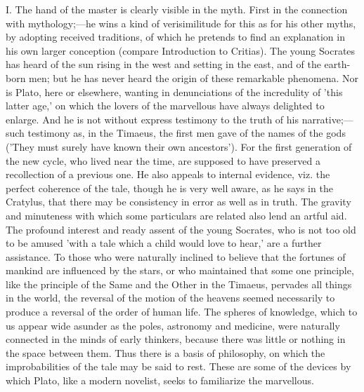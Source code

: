 \documentclass[11pt,letter]{article}
\begin{document}
\par  I. The hand of the master is clearly visible in the myth. First in the connection with mythology;—he wins a kind of verisimilitude for this as for his other myths, by adopting received traditions, of which he pretends to find an explanation in his own larger conception (compare Introduction to Critias). The young Socrates has heard of the sun rising in the west and setting in the east, and of the earth-born men; but he has never heard the origin of these remarkable phenomena. Nor is Plato, here or elsewhere, wanting in denunciations of the incredulity of 'this latter age,' on which the lovers of the marvellous have always delighted to enlarge. And he is not without express testimony to the truth of his narrative;—such testimony as, in the Timaeus, the first men gave of the names of the gods ('They must surely have known their own ancestors'). For the first generation of the new cycle, who lived near the time, are supposed to have preserved a recollection of a previous one. He also appeals to internal evidence, viz. the perfect coherence of the tale, though he is very well aware, as he says in the Cratylus, that there may be consistency in error as well as in truth. The gravity and minuteness with which some particulars are related also lend an artful aid. The profound interest and ready assent of the young Socrates, who is not too old to be amused 'with a tale which a child would love to hear,' are a further assistance. To those who were naturally inclined to believe that the fortunes of mankind are influenced by the stars, or who maintained that some one principle, like the principle of the Same and the Other in the Timaeus, pervades all things in the world, the reversal of the motion of the heavens seemed necessarily to produce a reversal of the order of human life. The spheres of knowledge, which to us appear wide asunder as the poles, astronomy and medicine, were naturally connected in the minds of early thinkers, because there was little or nothing in the space between them. Thus there is a basis of philosophy, on which the improbabilities of the tale may be said to rest. These are some of the devices by which Plato, like a modern novelist, seeks to familiarize the marvellous.
\end{document}
